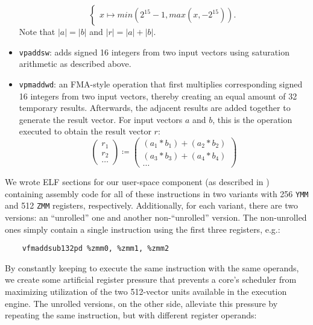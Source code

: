 \begin{itemize}
\begin{displaymath}
\begin{cases}
			x \mapsto min(2^{15}-1, max(x, -2^{15})).
		\end{cases}
		\end{displaymath}
		Note that $|a| = |b|$ and $|r| = |a| + |b|$.
	\item \texttt{vpaddsw}: adds signed \SI{16}{\bit} integers from two input vectors using saturation arithmetic as described above.
	\item \texttt{vpmaddwd}: an \gls{FMA}-style operation that first multiplies corresponding signed \SI{16}{\bit} integers from two input vectors, thereby creating an equal amount of \SI{32}{\bit} temporary results. Afterwards, the adjacent results are added together to generate the result vector. For input vectors $a$ and $b$, this is the operation executed to obtain the result vector $r$:
		\begin{displaymath}
		\begin{pmatrix}
		r_1 \\
		r_2 \\
		\dots
		\end{pmatrix}
		\coloneqq
		\begin{pmatrix}
		(a_1*b_1) + (a_2*b_2) \\
		(a_3*b_3) + (a_4*b_4) \\
		\dots
		\end{pmatrix}
		\end{displaymath}
\end{itemize}

We wrote \gls{ELF} sections for our user-space component (as described in ) containing assembly code for all of these instructions in two variants with \SI{256}{\bit} \texttt{YMM} and \SI{512}{\bit} \texttt{ZMM} registers, respectively. Additionally, for each variant, there are two versions: an \enquote{unrolled} one and another non-\enquote{unrolled} version. The non-unrolled ones simply contain a single instruction using the first three registers, e.g.:

\begin{center}
	\begin{verbatim}
	vfmaddsub132pd %zmm0, %zmm1, %zmm2
	\end{verbatim}
\end{center}

By constantly keeping to execute the same instruction with the same operands, we create some artificial register pressure that prevents a core's scheduler from maximizing utilization of the two \SI{512}{\bit}-vector units available in the execution engine. The unrolled versions, on the other side, alleviate this pressure by repeating the same instruction, but with different register operands:

